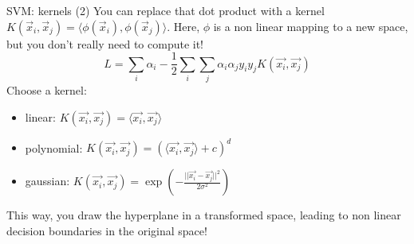 \begin{frame}{SVM: kernels (2)}
You can replace that dot product with a kernel $K(\vec{x}_i,\vec{x}_j)=\langle\phi(\vec{x}_i),\phi(\vec{x}_j)\rangle$. Here, $\phi$ is a non linear mapping to a new space, but you don't really need to compute it!
\begin{equation}
L = \sum_i \alpha_i - \frac{1}{2} \sum_i \sum_j \alpha_i \alpha_j y_i y_j K(\vec{x_i}, \vec{x_j})
\end{equation}
Choose a kernel:
\begin{itemize}
\item linear: $K(\vec{x_i}, \vec{x_j}) = \langle \vec{x_i},\vec{x_j}\rangle$
\item polynomial: $K(\vec{x_i}, \vec{x_j}) = (\langle \vec{x_i},\vec{x_j}\rangle+c)^d$
\item gaussian: $K(\vec{x_i}, \vec{x_j}) = \exp(-\frac{||\vec{x_i}-\vec{x_j}||^2}{2\sigma^2})$
\end{itemize}
This way, you draw the hyperplane in a transformed space, leading to non linear decision boundaries in the original space!
\end{frame}